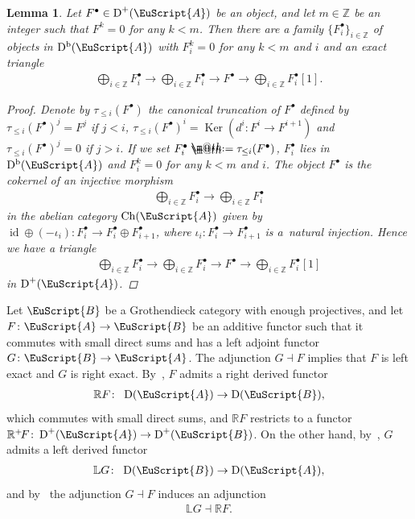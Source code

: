 \documentclass[10pt,a4paper]{amsart}
\makeatletter
\newtheorem{lem}[dfn]{Lemma}
\newcommand*{\defeq}{\mathrel{\rlap{%
 \raisebox{0.3ex}{$\m@th\cdot$}}%
 \raisebox{-0.3ex}{$\m@th\cdot$}}%
 =}
\numberwithin{equation}{section}
\newcommand{\Ch}{\operatorname{Ch}}
\newcommand{\Db}{\operatorname{D^b}}
\newcommand{\D}{\operatorname{D}}
\newcommand{\id}{\operatorname{id}}
\newcommand{\Ker}{\operatorname{Ker}}
\newcommand{\bL}{\mathbb{L}}
\newcommand{\bR}{\mathbb{R}}
\newcommand{\bZ}{\mathbb{Z}}
\newcommand{\scrA}{\EuScript{A}}
\newcommand{\scrB}{\EuScript{B}}
\makeatother
\begin{document}
\begin{lem}\label{canonical truncation}
Let $F^{\bullet}\in \D^+(\scrA)$ be an object, and let $m\in \bZ$ be an integer such that $F^k=0$ for any $k<m$. Then there are a family $\{F^{\bullet}_i\}_{i\in \bZ}$ of objects in $\Db(\scrA)$ with $F^{k}_i=0$ for any $k<m$ and $i$ and an exact triangle
\begin{gather*}
\bigoplus_{i\in \bZ}F^{\bullet}_i\to \bigoplus_{i\in \bZ}F^{\bullet}_i\to F^{\bullet}\to \bigoplus_{i\in \bZ}F^{\bullet}_i[1].
\end{gather*}
\begin{proof}
Denote by $\tau_{\leq i}(F^{\bullet})$ the canonical truncation of $F^{\bullet}$ defined by $\tau_{\leq i}(F^{\bullet})^j=F^j$ if $j<i$, $\tau_{\leq i}(F^{\bullet})^i=\Ker(d^i\colon F^i\to F^{i+1})$ and $\tau_{\leq i}(F^{\bullet})^j=0$ if $j>i$. If we set $F_i^{\bullet}\defeq \tau_{\leq i}(F^{\bullet})$, $F_i^{\bullet}$ lies in~$\Db(\scrA)$ and $F^{k}_i=0$ for any $k<m$ and $i$. The object $F^{\bullet}$ is the cokernel of an injective morphism
\begin{gather*}
\bigoplus_{i\in \bZ} F^{\bullet}_i\to \bigoplus_{i\in \bZ} F^{\bullet}_i
\end{gather*}
in the abelian category $\Ch(\scrA)$ given by
 $\id \oplus (-\iota_i)\colon F^{\bullet}_i\to F^{\bullet}_i\oplus F^{\bullet}_{i+1}$, where $\iota_i\colon F^{\bullet}_i\to F^{\bullet}_{i+1}$ is a~natural injection. Hence we have a triangle
\begin{gather*}
\bigoplus_{i\in \bZ}F^{\bullet}_i\to \bigoplus_{i\in \bZ}F^{\bullet}_i\to F^{\bullet}\to \bigoplus_{i\in \bZ}F^{\bullet}_i[1]
\end{gather*}
in $\D^+(\scrA)$.
\end{proof}
\end{lem}

Let $\scrB$ be a Grothendieck category with enough projectives, and let $F\colon \scrA\to\scrB$ be an addi\-tive functor such that it commutes with small direct sums and has a left adjoint functor $G\colon \scrB\to \scrA$. The adjunction $G\dashv F$ implies that $F$ is left exact and $G$ is right exact. By~\cite[Proposition~14.3.4]{ks2}, $F$ admits a right derived functor
 \begin{gather*}
 \bR F\colon\ \D(\scrA)\to \D(\scrB),
 \end{gather*}
 which commutes with small direct sums, and $ \bR F$ restricts to a functor $\bR^+\!F\colon \D^+(\scrA)\to \D^+(\scrB)$. On the other hand, by~\cite[Theorem~14.4.3]{ks2}, $G$ admits a left derived functor
 \begin{gather*}
 \bL G\colon\ \D(\scrB)\to \D(\scrA),
 \end{gather*}
 and by~\cite[Theorem~14.4.5]{ks2} the adjunction $G\dashv F$ induces an adjunction
 \begin{gather*}
 \bL G\dashv \bR F.
 \end{gather*}
\end{document}
